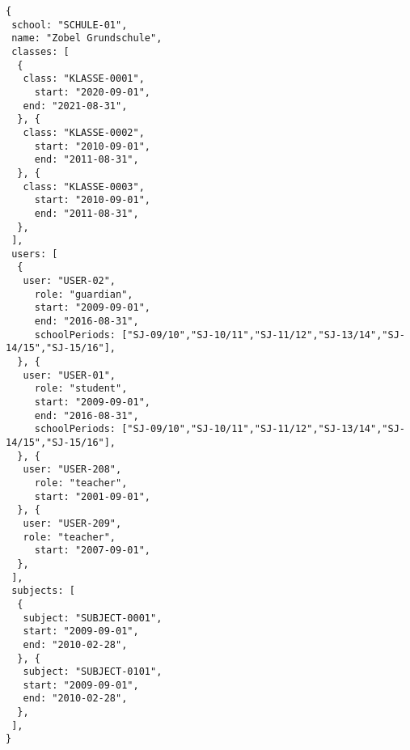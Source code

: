 
\begin{lstlisting}[caption={Schulen-Datenmodell Beispiel 1},frame=tlrb]
{
 school: "SCHULE-01",
 name: "Zobel Grundschule",
 classes: [ 
  {
   class: "KLASSE-0001",
	 start: "2020-09-01",
   end: "2021-08-31",
  }, {
   class: "KLASSE-0002",
	 start: "2010-09-01",
	 end: "2011-08-31",
  }, {
   class: "KLASSE-0003", 
	 start: "2010-09-01",
	 end: "2011-08-31",
  },
 ],
 users: [
  {
   user: "USER-02",
 	 role: "guardian",
	 start: "2009-09-01",
	 end: "2016-08-31",
	 schoolPeriods: ["SJ-09/10","SJ-10/11","SJ-11/12","SJ-13/14","SJ-14/15","SJ-15/16"],
  }, {
   user: "USER-01",
	 role: "student",
	 start: "2009-09-01",
	 end: "2016-08-31",
	 schoolPeriods: ["SJ-09/10","SJ-10/11","SJ-11/12","SJ-13/14","SJ-14/15","SJ-15/16"],
  }, {
   user: "USER-208",
	 role: "teacher",
	 start: "2001-09-01",
  }, {
   user: "USER-209",
   role: "teacher",
 	 start: "2007-09-01",
  },
 ],
 subjects: [
  {
   subject: "SUBJECT-0001",
   start: "2009-09-01",
   end: "2010-02-28",
  }, {
   subject: "SUBJECT-0101",
   start: "2009-09-01",
   end: "2010-02-28",
  }, 
 ],
}
\end{lstlisting}
